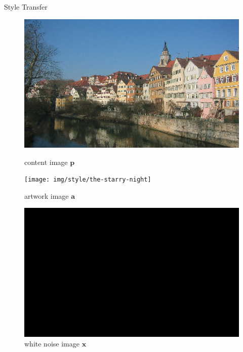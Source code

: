 \documentclass{beamer}
\begin{document}
\begin{frame}{Style Transfer}
\begin{figure}[ht]
    \begin{minipage}[b]{0.34\linewidth}
        \centering
        \includegraphics[width=\textwidth]{img/content/tubingen}
        \caption*{content image $\mathbf{p}$}
    \end{minipage}
    \hspace{0.5cm}
    \begin{minipage}[b]{0.34\linewidth}
        \centering
        \texttt{[image: img/style/the-starry-night]}
        \caption*{artwork image $\mathbf{a}$}
    \end{minipage}
    \hspace{0.5cm}
    \begin{minipage}[b]{0.34\linewidth}
        \centering
        \includegraphics[width=\textwidth]{img/style/noise}
        \caption*{white noise image $\mathbf{x}$}
    \end{minipage}
\end{figure}
\end{frame}
\end{document}
